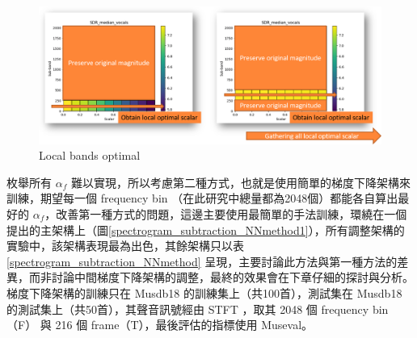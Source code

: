 \begin{figure}[htbp]
    \hfil
    \begin{minipage}[t]{0.65\textwidth}
        \includegraphics[width=\textwidth]{./figures/chapter04_experiment/Local_Bands_Optimal3.png}
        \caption {Local bands optimal}
        \label{Local_Bands_Optimal3}
    \end{minipage}
    \hfil
\end{figure}

枚舉所有 $\alpha_f$ 難以實現，所以考慮第二種方式，也就是使用簡單的梯度下降架構來訓練，期望每一個 frequency bin （在此研究中總量都為2048個）都能各自算出最好的 $\alpha_f$，改善第一種方式的問題，這邊主要使用最簡單的手法訓練，環繞在一個提出的主架構上（圖\ref{spectrogram_subtraction_NNmethod1}），所有調整架構的實驗中，該架構表現最為出色，其餘架構只以表\ref{spectrogram_subtraction_NNmethod} 呈現，主要討論此方法與第一種方法的差異，而非討論中間梯度下降架構的調整，最終的效果會在下章仔細的探討與分析。梯度下降架構的訓練只在 Musdb18 的訓練集上（共100首），測試集在 Musdb18 的測試集上（共50首），其聲音訊號經由 STFT ，取其 2048 個 frequency bin （F） 與 216 個 frame（T），最後評估的指標使用 Museval。

\begin{table}[htbp]
\centering
{}
\caption{過程中梯度下降架構的調整}
\label{spectrogram_subtraction_NNmethod}
\end{table}

